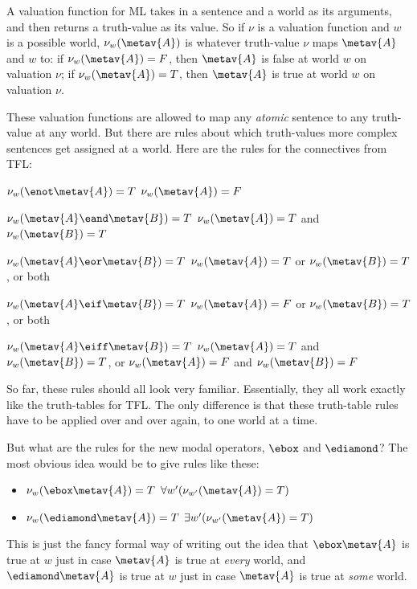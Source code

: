 A valuation function for ML takes in a sentence and a world as its arguments, and then returns a truth-value as its value. So if $\nu$ is a valuation function and $w$ is a possible world, $\nu_w(\metav{A})$ is whatever truth-value $\nu$ maps $\metav{A}$ and $w$ to: if $\nu_w(\metav{A})=F$, then $\metav{A}$ is false at world $w$ on valuation $\nu$; if $\nu_w(\metav{A})=T$, then $\metav{A}$ is true at world $w$ on valuation $\nu$.

These valuation functions are allowed to map any \emph{atomic} sentence to any truth-value at any world. But there are rules about which truth-values more complex sentences get assigned at a world. Here are the rules for the connectives from TFL:
\begin{compactlist}
	\item $\nu_w(\enot\metav{A})=T$ \ifeff{} $\nu_w(\metav{A})=F$
	\item $\nu_w(\metav{A}\eand\metav{B})=T$ \ifeff{} $\nu_w(\metav{A})=T$ and $\nu_w(\metav{B})=T$
	\item $\nu_w(\metav{A}\eor\metav{B})=T$ \ifeff{} $\nu_w(\metav{A})=T$ or $\nu_w(\metav{B})=T$, or both
	\item $\nu_w(\metav{A}\eif\metav{B})=T$ \ifeff{} $\nu_w(\metav{A})=F$ or $\nu_w(\metav{B})=T$, or both
	\item $\nu_w(\metav{A}\eiff\metav{B})=T$ \ifeff{} $\nu_w(\metav{A})=T$ and $\nu_w(\metav{B})=T$, or $\nu_w(\metav{A})=F$ and $\nu_w(\metav{B})=F$
\end{compactlist}
So far, these rules should all look very familiar. Essentially, they all work exactly like the truth-tables for TFL. The only difference is that these truth-table rules have to be applied over and over again, to one world at a time.

But what are the rules for the new modal operators, $\ebox$ and $\ediamond$? The most obvious idea would be to give rules like these:
\begin{itemize}
	\item $\nu_w(\ebox \metav{A})=T$ \ifeff{} $\forall w' (\nu_{w'}(\metav{A})=T)$
	\item $\nu_w(\ediamond \metav{A})=T$ \ifeff{} $\exists w' (\nu_{w'}(\metav{A})=T)$
\end{itemize}
This is just the fancy formal way of writing out the idea that $\ebox\metav{A}$ is true at $w$ just in case $\metav{A}$ is true at \emph{every} world, and $\ediamond\metav{A}$ is true at $w$ just in case $\metav{A}$ is true at \emph{some} world.

